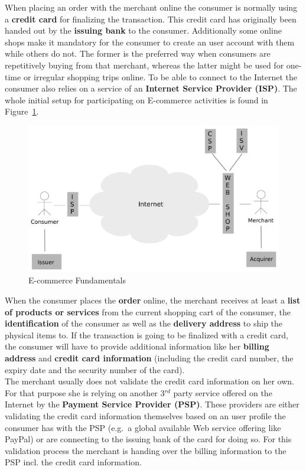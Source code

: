 When placing an order with the merchant online the consumer is normally using a \textbf{credit card} for finalizing the transaction. This credit card has originally been handed out by the \textbf{issuing bank} to the consumer. Additionally some online shops make it mandatory for the consumer to create an user account with them while others do not. The former is the preferred way when consumers are repetitively buying from that merchant, whereas the latter might be used for one-time or irregular shopping trips online. To be able to connect to the Internet the consumer also relies on a service of an \textbf{Internet Service Provider (\gls{ISP})}. The whole initial setup for participating on E-commerce activities is found in Figure~\ref{fig:images_ecommerce_scenario}.\@

\begin{figure}[H]
	\centering
		\includegraphics[width=0.8\columnwidth]{images/e-commerce-scenario.pdf}
	\caption{E-commerce Fundamentals}
\label{fig:images_ecommerce_scenario}
\end{figure}

When the consumer places the \textbf{order} online, the merchant receives at least a \textbf{list of products or services} from the current shopping cart of the consumer, the \textbf{identification} of the consumer as well as the \textbf{delivery address} to ship the physical items to. If the transaction is going to be finalized with a credit card, the consumer will have to provide additional information like her \textbf{billing address} and \textbf{credit card information} (including the credit card number, the expiry date and the security number of the card). \\

The merchant usually does not validate the credit card information on her own. For that purpose she is relying on another 3$^{rd}$ party service offered on the Internet by the \textbf{Payment Service Provider (\gls{PSP})}. These providers are either validating the credit card information themselves based on an user profile the consumer has with the \gls{PSP} (e.g.\ a global available Web service offering like PayPal) or are connecting to the issuing bank of the card for doing so. For this validation process the merchant is handing over the billing information to the \gls{PSP} incl. the credit card information. \\

